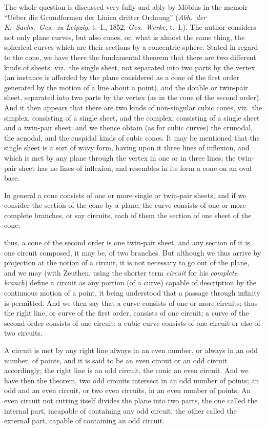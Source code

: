 \documentclass[12pt,a4paper,oneside]{book}
\begin{document}
The whole question is discussed very fully and ably by M\"obius in the memoir ``Ueber die Grundformen der Linien dritter Ordnung'' (\textit{Abh.\ der K.\ Sachs.\ Ges.\ zu Leipzig}, t.~I., 1852; \textit{Ges.\ Werke}, t.~I.). The author considers not only plane curves, but also cones, or, what is almost the same thing, the spherical curves which are their sections by a concentric sphere. Stated in regard to the cone, we have there the fundamental theorem that there are two different kinds of sheets: viz.\ the single sheet, not separated into two parts by the vertex (an instance is afforded by the plane considered as a cone of the first order generated by the motion of a line about a point), and the double or twin-pair sheet, separated into two parts by the vertex (as in the cone of the second order). And it then appears that there are two kinds of non-singular cubic cones, viz.\ the simplex, consisting of a single sheet, and the complex, consisting of a single sheet and a twin-pair sheet; and we thence obtain (as for cubic curves) the crunodal, the acnodal, and the cuspidal kinds of cubic cones. It may be mentioned that the single sheet is a sort of wavy form, having upon it three lines of inflexion, and which is met by any plane through the vertex in one or in three lines; the twin-pair sheet has no lines of inflexion, and resembles in its form a cone on an oval base.

In general a cone consists of one or more single or twin-pair sheets, and if we consider the section of the cone by a plane, the curve consists of one or more complete branches, or say circuits, each of them the section of one sheet of the cone;

\newpage
thus, a cone of the second order is one twin-pair sheet, and any section of it is one circuit composed, it may be, of two branches. But although we thus arrive by projection at the notion of a circuit, it is not necessary to go out of the plane, and we may (with Zeuthen, using the shorter term \textit{circuit} for his \textit{complete branch}) define a circuit as any portion (of a curve) capable of description by the continuous motion of a point, it being understood that a passage through infinity is permitted. And we then say that a curve consists of one or more circuits; thus the right line, or curve of the first order, consists of one circuit; a curve of the second order consists of one circuit; a cubic curve consists of one circuit or else of two circuits.

A circuit is met by any right line always in an even number, or always in an odd number, of points, and it is said to be an even circuit or an odd circuit accordingly; the right line is an odd circuit, the conic an even circuit. And we have then the theorem, two odd circuits intersect in an odd number of points; an odd and an even circuit, or two even circuits, in an even number of points. An even circuit not cutting itself divides the plane into two parts, the one called the internal part, incapable of containing any odd circuit, the other called the external part, capable of containing an odd circuit.
\end{document}
